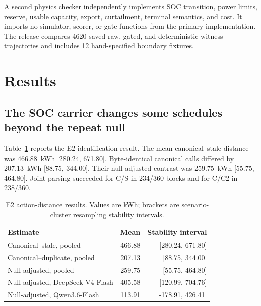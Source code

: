 \documentclass[11pt]{article}
\newcommand{\EIIBlocks}{360}
\newcommand{\EIICS}{466.88}
\newcommand{\EIICSLow}{280.24}
\newcommand{\EIICSHigh}{671.80}
\newcommand{\EIINull}{207.13}
\newcommand{\EIINullLow}{88.75}
\newcommand{\EIINullHigh}{344.00}
\newcommand{\EIIAdjusted}{259.75}
\newcommand{\EIIAdjustedLow}{55.75}
\newcommand{\EIIAdjustedHigh}{464.80}
\newcommand{\EIIDeepAdjusted}{405.58}
\newcommand{\EIIDeepAdjustedLow}{120.99}
\newcommand{\EIIDeepAdjustedHigh}{704.76}
\newcommand{\EIIQwenAdjusted}{113.91}
\newcommand{\EIIQwenAdjustedLow}{-178.91}
\newcommand{\EIIQwenAdjustedHigh}{426.41}
\newcommand{\EIIParsedPairsCS}{234}
\newcommand{\EIIParsedPairsCC}{238}
\newcommand{\PhysicsComparisons}{4620}
\newcommand{\PhysicsFixtures}{12}
\begin{document}
A second physics checker independently implements SOC transition, power limits, reserve, usable
capacity, export, curtailment, terminal semantics, and cost. It imports no simulator, scorer, or
gate functions from the primary implementation. The release compares \PhysicsComparisons{} saved
raw, gated, and deterministic-witness trajectories and includes \PhysicsFixtures{} hand-specified
boundary fixtures.

\section{Results}
\label{sec:results}

\subsection{The SOC carrier changes some schedules beyond the repeat null}

Table~\ref{tab:e2-core} reports the E2 identification result. The mean canonical--stale distance
was \EIICS{}~kWh [\EIICSLow{}, \EIICSHigh{}]. Byte-identical canonical calls differed by
\EIINull{}~kWh [\EIINullLow{}, \EIINullHigh{}]. Their null-adjusted contrast was
\EIIAdjusted{}~kWh [\EIIAdjustedLow{}, \EIIAdjustedHigh{}]. Joint parsing succeeded for C/S in
\EIIParsedPairsCS{}/\EIIBlocks{} blocks and for C/C2 in
\EIIParsedPairsCC{}/\EIIBlocks{}.

\begin{table}[!htbp]
\centering
\caption{E2 action-distance results. Values are kWh; brackets are scenario-cluster resampling
stability intervals.}
\label{tab:e2-core}
\small
\begin{tabular}{@{}lrr@{}}
\toprule
Estimate & Mean & Stability interval \\
\midrule
Canonical--stale, pooled & \EIICS & [\EIICSLow, \EIICSHigh] \\
Canonical--duplicate, pooled & \EIINull & [\EIINullLow, \EIINullHigh] \\
Null-adjusted, pooled & \EIIAdjusted & [\EIIAdjustedLow, \EIIAdjustedHigh] \\
Null-adjusted, DeepSeek-V4-Flash & \EIIDeepAdjusted & [\EIIDeepAdjustedLow, \EIIDeepAdjustedHigh] \\
Null-adjusted, Qwen3.6-Flash & \EIIQwenAdjusted & [\EIIQwenAdjustedLow, \EIIQwenAdjustedHigh] \\
\bottomrule
\end{tabular}
\end{table}
\end{document}
